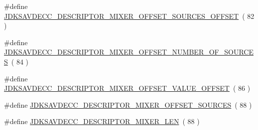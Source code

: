 \begin{DoxyCompactItemize}
\item 
\#define \hyperlink{group__descriptor__mixer_ga94538bf30754f8734260f17f9695b996}{J\+D\+K\+S\+A\+V\+D\+E\+C\+C\+\_\+\+D\+E\+S\+C\+R\+I\+P\+T\+O\+R\+\_\+\+M\+I\+X\+E\+R\+\_\+\+O\+F\+F\+S\+E\+T\+\_\+\+S\+O\+U\+R\+C\+E\+S\+\_\+\+O\+F\+F\+S\+ET}~( 82 )
\item 
\#define \hyperlink{group__descriptor__mixer_ga300d6137b8e56f28d26a677257361587}{J\+D\+K\+S\+A\+V\+D\+E\+C\+C\+\_\+\+D\+E\+S\+C\+R\+I\+P\+T\+O\+R\+\_\+\+M\+I\+X\+E\+R\+\_\+\+O\+F\+F\+S\+E\+T\+\_\+\+N\+U\+M\+B\+E\+R\+\_\+\+O\+F\+\_\+\+S\+O\+U\+R\+C\+ES}~( 84 )
\item 
\#define \hyperlink{group__descriptor__mixer_gabb5a4b78adada52a77365021773ae1dd}{J\+D\+K\+S\+A\+V\+D\+E\+C\+C\+\_\+\+D\+E\+S\+C\+R\+I\+P\+T\+O\+R\+\_\+\+M\+I\+X\+E\+R\+\_\+\+O\+F\+F\+S\+E\+T\+\_\+\+V\+A\+L\+U\+E\+\_\+\+O\+F\+F\+S\+ET}~( 86 )
\item 
\#define \hyperlink{group__descriptor__mixer_gaca27fc8c90703c6e0d6ab4c626b165b7}{J\+D\+K\+S\+A\+V\+D\+E\+C\+C\+\_\+\+D\+E\+S\+C\+R\+I\+P\+T\+O\+R\+\_\+\+M\+I\+X\+E\+R\+\_\+\+O\+F\+F\+S\+E\+T\+\_\+\+S\+O\+U\+R\+C\+ES}~( 88 )
\item 
\#define \hyperlink{group__descriptor__mixer_ga54e31d2393566efeee213c24cb777130}{J\+D\+K\+S\+A\+V\+D\+E\+C\+C\+\_\+\+D\+E\+S\+C\+R\+I\+P\+T\+O\+R\+\_\+\+M\+I\+X\+E\+R\+\_\+\+L\+EN}~( 88 )
\end{DoxyCompactItemize}
